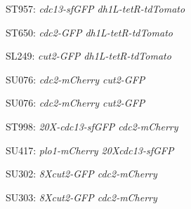 \framebreak
\begin{figure}
\centering
   \def\svgwidth{0.75\columnwidth}

\caption{ST957: {\it cdc13-sfGFP dh1L-tetR-tdTomato}}
\end{figure}

\framebreak

\begin{figure}
\centering
   \def\svgwidth{0.75\columnwidth}

\caption{ST650: {\it cdc2-GFP dh1L-tetR-tdTomato}}
\end{figure}

\framebreak
\begin{figure}

\centering
   \def\svgwidth{0.75\columnwidth}

\caption{SL249: {\it cut2-GFP dh1L-tetR-tdTomato}}
\end{figure}

\framebreak
\begin{figure}
\centering
   \def\svgwidth{0.75\columnwidth}

\caption{SU076: {\it cdc2-mCherry cut2-GFP}}
\end{figure}


\framebreak
\begin{figure}
\centering
   \def\svgwidth{0.75\columnwidth}

\caption{SU076: {\it cdc2-mCherry cut2-GFP}}
\end{figure}


\framebreak

\begin{figure}
\centering
   \def\svgwidth{0.75\columnwidth}

\caption{ {ST998: {\it 20X-cdc13-sfGFP cdc2-mCherry}}}
\end{figure}

\framebreak
\begin{figure}
\centering
   \def\svgwidth{0.75\columnwidth}

\caption{SU417: {\it plo1-mCherry 20Xcdc13-sfGFP}}
\end{figure}

\framebreak
\begin{figure}
\centering
   \def\svgwidth{0.75\columnwidth}

\caption {SU302: {\it 8Xcut2-GFP cdc2-mCherry}}
\end{figure}

\framebreak
\begin{figure}
\centering
   \def\svgwidth{0.75\columnwidth}

\caption{SU303: {\it 8Xcut2-GFP cdc2-mCherry }}
\end{figure}


